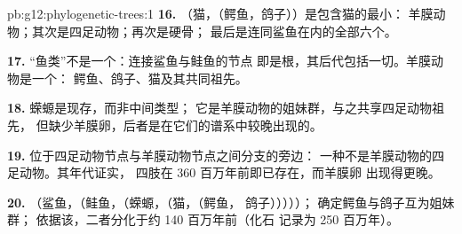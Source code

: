 \begin{solution}{pb:g12:phylogenetic-trees:1}
\textbf{16.} （猫，（鳄鱼，鸽子））是包含猫的最小：
羊膜动物；其次是四足动物；再次是硬骨；
最后是连同鲨鱼在内的全部六个。

\textbf{17.} “鱼类”不是一个：连接鲨鱼与鲑鱼的节点
即是根，其后代包括一切。羊膜动物是一个：
鳄鱼、鸽子、猫及其共同祖先。

\textbf{18.} 蝾螈是现存，而非中间类型；
它是羊膜动物的姐妹群，与之共享四足动物祖先，
但缺少羊膜卵，后者是在它们的谱系中较晚出现的。

\textbf{19.} 位于四足动物节点与羊膜动物节点之间分支的旁边：
一种不是羊膜动物的四足动物。其年代证实，
四肢在 360 百万年前即已存在，而羊膜卵
出现得更晚。

\textbf{20.} （鲨鱼，（鲑鱼，（蝾螈，（猫，（鳄鱼，
鸽子）））））； 确定鳄鱼与鸽子互为姐妹群；
依据该，二者分化于约 140 百万年前（化石
记录为 250 百万年）。
\end{solution}
